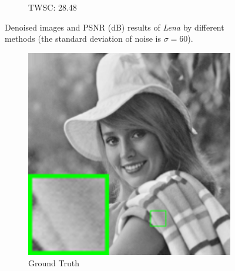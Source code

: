 \begin{figure}
\begin{adjustwidth}{-2cm}{}
\begin{subfigure}[t]{0.19\textwidth}
		\caption{TWSC: 28.48}
    \end{subfigure}
    \caption{Denoised images and PSNR (dB) results of \textsl{Lena} by different methods (the standard deviation of noise is $\sigma=60$).}
    \label{fig6}
\end{adjustwidth}
\end{figure}

\begin{figure}
\begin{adjustwidth}{-2cm}{}
    \centering
    \begin{subfigure}[t]{0.19\textwidth}
        \centering
        \includegraphics[width=1\textwidth]{images/twsc/awgn/resize_br_elaine.png}
	   \caption{Ground Truth}
    \end{subfigure}
    \hfill
    \begin{subfigure}[t]{0.19\textwidth}
        \centering

\end{subfigure}
\end{adjustwidth}
\end{figure}
